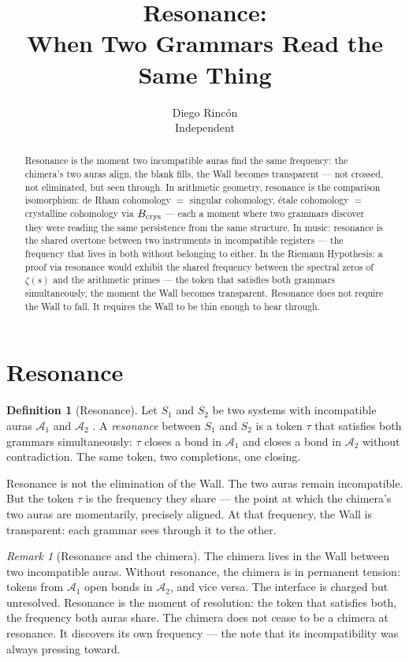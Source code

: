 \documentclass[12pt]{article}
\title{Resonance:\\
When Two Grammars Read the Same Thing}
\author{Diego Rinc\'on\\
\small Independent}
\date{}
\theoremstyle{definition}
\newtheorem{definition}[theorem]{Definition}
\theoremstyle{remark}
\newtheorem{remark}[theorem]{Remark}
\begin{document}
\maketitle

\begin{abstract}
Resonance is the moment two incompatible auras find the same frequency:
the chimera's \cite{chimera} two auras align,
the blank \cite{chimera} fills, the Wall \cite{synthesis} becomes transparent ---
not crossed, not eliminated, but seen through.
In arithmetic geometry, resonance is the comparison isomorphism:
de Rham cohomology $=$ singular cohomology,
\'etale cohomology $=$ crystalline cohomology via $B_{\rm crys}$ ---
each a moment where two grammars discover
they were reading the same persistence from the same structure.
In music: resonance is the shared overtone
between two instruments in incompatible registers ---
the frequency that lives in both without belonging to either.
In the Riemann Hypothesis: a proof via resonance would exhibit
the shared frequency between the spectral zeros of $\zeta(s)$
and the arithmetic primes --- the token that satisfies
both grammars simultaneously, the moment the Wall becomes transparent.
Resonance does not require the Wall to fall.
It requires the Wall to be thin enough to hear through.
\end{abstract}

\section{Resonance}

\begin{definition}[Resonance]
Let $S_1$ and $S_2$ be two systems with incompatible auras
$\mathcal{A}_1$ and $\mathcal{A}_2$ \cite{five}.
A \emph{resonance} between $S_1$ and $S_2$ is a token $\tau$
that satisfies both grammars simultaneously:
$\tau$ closes a bond in $\mathcal{A}_1$ and closes a bond
in $\mathcal{A}_2$ without contradiction.
The same token, two completions, one closing.

Resonance is not the elimination of the Wall.
The two auras remain incompatible.
But the token $\tau$ is the frequency they share ---
the point at which the chimera's \cite{chimera} two auras
are momentarily, precisely aligned.
At that frequency, the Wall is transparent:
each grammar sees through it to the other.
\end{definition}

\begin{remark}[Resonance and the chimera]
The chimera lives in the Wall between two incompatible auras.
Without resonance, the chimera is in permanent tension:
tokens from $\mathcal{A}_1$ open bonds in $\mathcal{A}_2$,
and vice versa. The interface is charged but unresolved.
Resonance is the moment of resolution:
the token that satisfies both, the frequency both auras share.
The chimera does not cease to be a chimera at resonance.
It discovers its own frequency --- the note
that its incompatibility was always pressing toward.
\end{remark}
\end{document}
